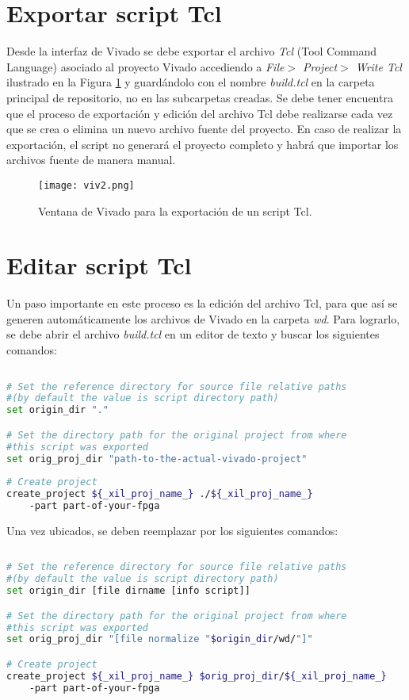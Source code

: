 \section{Exportar script Tcl}

	Desde la interfaz de Vivado se debe exportar el archivo \textit{Tcl} (Tool Command Language) asociado al proyecto Vivado accediendo a \textit{File$>$ Project$>$ Write Tcl} ilustrado en la Figura \ref{fig:viv2} y guardándolo con el nombre \textit{build.tcl} en la carpeta principal de repositorio, no en las subcarpetas creadas. Se debe tener encuentra que el proceso de exportación y edición del archivo Tcl debe realizarse cada vez que se crea o elimina un nuevo archivo fuente del proyecto. En caso de realizar la exportación, el script no generará el proyecto completo y habrá que importar los archivos fuente de manera manual.
	
	\begin{figure}[ht]
		\centering
		\texttt{[image: viv2.png]}
		\caption{Ventana de Vivado para la exportación de un script Tcl.}
		\label{fig:viv2}
	\end{figure}

\section{Editar script Tcl}
	Un paso importante en este proceso es la edición del archivo Tcl, para que así se generen automáticamente los archivos de Vivado en la carpeta \textit{wd}. Para lograrlo, se debe abrir el archivo \textit{build.tcl} en un editor de texto y buscar los siguientes comandos:

\begin{lstlisting}[language=bash, frame=single, basicstyle=\small]
	
# Set the reference directory for source file relative paths 
#(by default the value is script directory path)
set origin_dir "."

# Set the directory path for the original project from where
#this script was exported
set orig_proj_dir "path-to-the-actual-vivado-project"
	
# Create project
create_project ${_xil_proj_name_} ./${_xil_proj_name_} 
	-part part-of-your-fpga

\end{lstlisting}

	Una vez ubicados, se deben reemplazar por los siguientes comandos:
	
\begin{lstlisting}[language=bash, frame=single, basicstyle=\small]
	
# Set the reference directory for source file relative paths 
#(by default the value is script directory path)
set origin_dir [file dirname [info script]]

# Set the directory path for the original project from where 
#this script was exported
set orig_proj_dir "[file normalize "$origin_dir/wd/"]"

# Create project
create_project ${_xil_proj_name_} $orig_proj_dir/${_xil_proj_name_} 
	-part part-of-your-fpga

\end{lstlisting}


